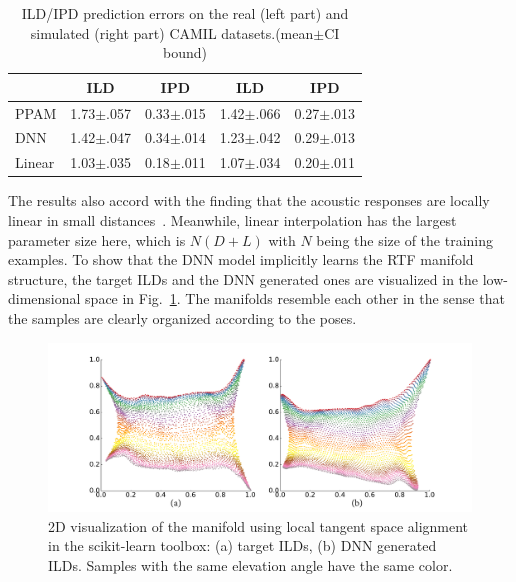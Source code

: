 \documentclass[journal]{IEEEtran}
\begin{document}
\begin{table}[!h]
\caption{ILD/IPD prediction errors on the real (left part) and simulated (right part) CAMIL datasets.(mean$\pm$CI bound)}
\label{table:camil}
\begin{center}
\begin{tabular}{|l|c|c||c|c|}
  \hline
                     & ILD & IPD               & ILD & IPD \\ \hline \hline
  PPAM    & 1.73$\pm$.057 & 0.33$\pm$.015   & 1.42$\pm$.066 & 0.27$\pm$.013 \\ \hline
  DNN     & 1.42$\pm$.047 & 0.34$\pm$.014   & 1.23$\pm$.042 & 0.29$\pm$.013\\ \hline
  Linear  & 1.03$\pm$.035 & 0.18$\pm$.011	& 1.07$\pm$.034 & 0.20$\pm$.011\\ \hline

\end{tabular}
\end{center}
\end{table}

The results also accord with the finding that the acoustic responses are locally linear in small distances~\cite{laufer2015study}. Meanwhile, linear interpolation has the largest parameter size here, which is $N(D+L)$ with $N$ being the size of the training examples. To show that the DNN model implicitly learns the RTF manifold structure, the target ILDs and the DNN generated ones are visualized in the low-dimensional space in Fig.~\ref{fig2:embed}. The manifolds resemble each other in the sense that the samples are clearly organized according to the poses.

\begin{figure}
\centering
\includegraphics[width=0.94\linewidth]{fig2_emb.pdf}
\caption{2D visualization of the manifold using local tangent space alignment in the scikit-learn toolbox: (a) target ILDs, (b) DNN generated ILDs. Samples with the same elevation angle have the same color.}
\label{fig2:embed}
\end{figure}
\end{document}
